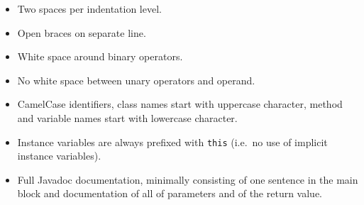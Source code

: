 \documentclass[a4paper,fleqn]{article}
\newcommand{\computercode}[1]{\texttt{#1}}
\begin{document}
\begin{itemize}

\item Two spaces per indentation level.

\item Open braces on separate line.

\item White space around binary operators.

\item No white space between unary operators and operand.

\item CamelCase identifiers, class names start with uppercase
  character, method and variable names start with lowercase character.

\item Instance variables are always prefixed with \computercode{this}
  (i.e.\ no use of implicit instance variables).

\item Full Javadoc documentation, minimally consisting of one sentence
  in the main block and documentation of all of parameters and of the
  return value.

\end{itemize}
\end{document}
